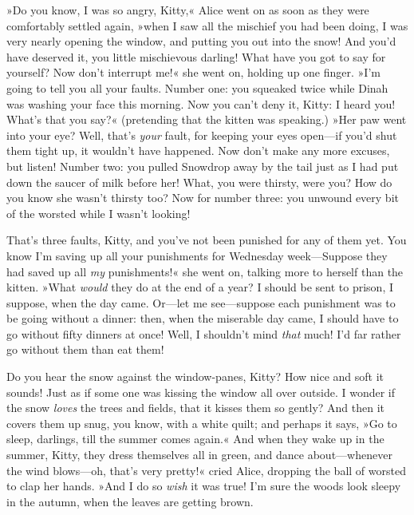 »Do you know, I was so angry, Kitty,« Alice went on as soon as they were comfortably settled again, »when I saw all the mischief you had been doing, I was very nearly opening the window, and putting you out into the snow! And you'd have deserved it, you little mischievous darling! What have you got to say for yourself? Now don't interrupt me!« she went on, holding up one finger. »I'm going to tell you all your faults. Number one: you squeaked twice while Dinah was washing your face this morning. Now you can't deny it, Kitty: I heard you! What's that you say?« (pretending that the kitten was speaking.) »Her paw went into your eye? Well, that's \textit{your} fault, for keeping your eyes open—if you'd shut them tight up, it wouldn't have happened. Now don't make any more excuses, but listen! Number two: you pulled Snowdrop away by the tail just as I had put down the saucer of milk before her! What, you were thirsty, were you? How do you know she wasn't thirsty too? Now for number three: you unwound every bit of the worsted while I wasn't looking!

That's three faults, Kitty, and you've not been punished for any of them yet. You know I'm saving up all your punishments for Wednesday week—Suppose they had saved up all \textit{my} punishments!« she went on, talking more to herself than the kitten. »What \textit{would} they do at the end of a year? I should be sent to prison, I suppose, when the day came. Or—let me see—suppose each punishment was to be going without a dinner: then, when the miserable day came, I should have to go without fifty dinners at once! Well, I shouldn't mind \textit{that} much! I'd far rather go without them than eat them!

Do you hear the snow against the window-panes, Kitty? How nice and soft it sounds! Just as if some one was kissing the window all over outside. I wonder if the snow \textit{loves} the trees and fields, that it kisses them so gently? And then it covers them up snug, you know, with a white quilt; and perhaps it says, »Go to sleep, darlings, till the summer comes again.« And when they wake up in the summer, Kitty, they dress themselves all in green, and dance about—whenever the wind blows—oh, that's very pretty!« cried Alice, dropping the ball of worsted to clap her hands. »And I do so \textit{wish} it was true! I'm sure the woods look sleepy in the autumn, when the leaves are getting brown.

